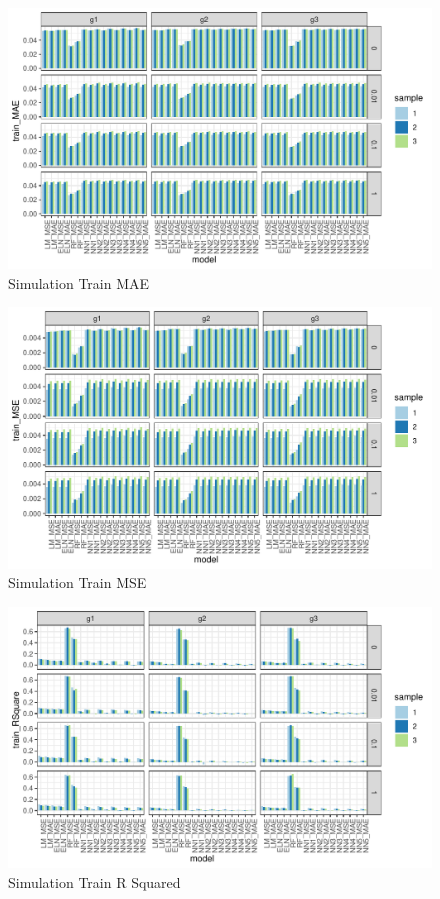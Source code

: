 \documentclass[11pt, a4paper, table]{article}
\begin{document}
\begin{figure}
	\includegraphics{simulation_train_mae.pdf}
	\caption{Simulation Train MAE}
\end{figure}

\begin{figure}
	\includegraphics{simulation_train_mse.pdf}
	\caption{Simulation Train MSE}
\end{figure}

\begin{figure}
	\includegraphics{simulation_train_rsquare.pdf}
	\caption{Simulation Train R Squared}
\end{figure}
\end{document}
